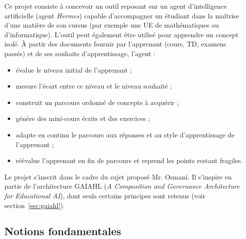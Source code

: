 \documentclass[11pt,a4paper]{article}
\begin{document}
Ce projet consiste à concevoir un outil reposant sur un agent d'intelligence artificielle (agent \textit{Hermes}) capable d'accompagner un étudiant dans la maîtrise d'une matière de son cursus (par exemple une UE de mathématiques ou d'informatique). L'outil peut également être utilisé pour apprendre un concept isolé. À partir des documents fournis par l'apprenant (cours, TD, examens passés) et de ses souhaits d'apprentissage, l'agent :
\begin{itemize}[noitemsep]
  \item évalue le niveau initial de l'apprenant ;
  \item mesure l'écart entre ce niveau et le niveau souhaité ;
  \item construit un parcours ordonné de concepts à acquérir ;
  \item génère des mini-cours écrits et des exercices ;
  \item adapte en continu le parcours aux réponses et au style d'apprentissage de l'apprenant ;
  \item réévalue l'apprenant en fin de parcours et reprend les points restant fragiles.
\end{itemize}

Le projet s'inscrit dans le cadre du sujet proposé Mr. Osmani. Il s'inspire en partie de l'architecture GAIAHL (\textit{A Composition and Governance Architecture for Educational AI}), dont seuls certains principes sont retenus (voir section~\ref{sec:gaiahl}).

\subsection{Notions fondamentales}
\end{document}
